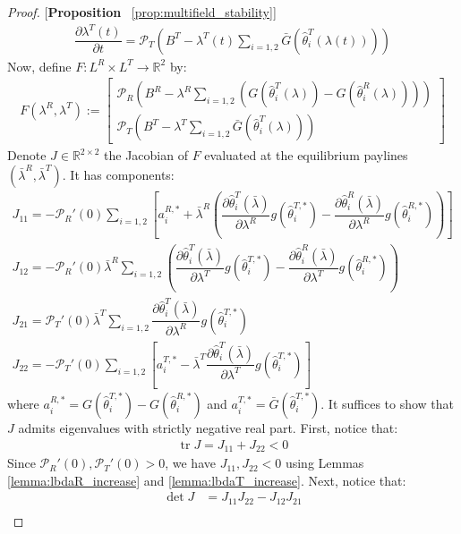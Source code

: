 \begin{proof}{[\textbf{Proposition} ~\ref{prop:multifield_stability}]}
\begin{gather*}
  \dfrac{\partial \lambda^T(t)}{\partial t} = \mathcal{P}_T\left(B^T - \lambda^T(t)\sum_{i=1,2}\bar{G}(\hat{\theta}_i^T(\lambda(t)))\right)
\end{gather*}
Now, define $F:L^R\times L^T\rightarrow \mathbb{R}^2$ by:
\begin{align*}
  F(\lambda^R,\lambda^T) := \begin{bmatrix}\mathcal{P}_R\left(B^R -  \lambda^R\sum_{i=1,2}(G(\hat{\theta}^{T}_i(\lambda)) - G(\hat{\theta}^{R}_i(\lambda)))\right)  \\ \mathcal{P}_T\left(B^T - \lambda^T\sum_{i=1,2}\bar{G}(\hat{\theta}_i^T(\lambda))\right) \end{bmatrix}
\end{align*}
Denote $J\in \mathbb{R}^{2\times 2}$ the Jacobian of $F$ evaluated at the equilibrium paylines $(\bar{\lambda}^R,\bar{\lambda}^T)$. It has components:
\begin{gather*}
  J_{11} = -\mathcal{P}_R'(0)\sum_{i=1,2}\left[a_i^{R,*} + \bar{\lambda}^R\left(\dfrac{\partial \hat{\theta}_i^T(\bar{\lambda})}{\partial \lambda^R}g(\hat{\theta}_i^{T,*}) - \dfrac{\partial \hat{\theta}^R_i(\bar{\lambda})}{\partial \lambda^R}g(\hat{\theta}^{R,*}_i)\right)\right] \\ 
  J_{12} = -\mathcal{P}_R'(0)\bar{\lambda}^R\sum_{i=1,2}\left(\dfrac{\partial \hat{\theta}_i^T(\bar{\lambda})}{\partial \lambda^T}g(\hat{\theta}_i^{T,*}) - \dfrac{\partial \hat{\theta}^R_i(\bar{\lambda})}{\partial \lambda^T}g(\hat{\theta}^{R,*}_i)\right)\\ 
  J_{21} = \mathcal{P}_T'(0)\bar{\lambda}^T\sum_{i=1,2}\dfrac{\partial \hat{\theta}_i^T(\bar{\lambda}) }{\partial \lambda^R}g(\hat{\theta}^{T,*}_i) \\ 
  J_{22} = -\mathcal{P}_T'(0)\sum_{i=1,2}\left[a_i^{T,*} - \bar{\lambda}^T\dfrac{\partial \hat{\theta}_i^T(\bar{\lambda})}{\partial \lambda^T}g(\hat{\theta}_i^{T,*})\right]
\end{gather*}
where $a_i^{R,*} = G(\hat{\theta}^{T,*}_i) - G(\hat{\theta}^{R,*}_i)$ and $a_i^{T,*} = \bar{G}(\hat{\theta}^{T,*}_i)$. It suffices to show that $J$ admits eigenvalues with strictly negative real part. First, notice that:
\begin{align*}
  \operatorname{tr} J = J_{11} + J_{22}<0
\end{align*}
Since $\mathcal{P}_R'(0),\mathcal{P}_T'(0)>0$, we have $J_{11},J_{22}<0$ using Lemmas \ref{lemma:lbdaR_increase} and \ref{lemma:lbdaT_increase}. Next, notice that:
\begin{align*}
  \operatorname{det} J &= J_{11}J_{22} - J_{12}J_{21} \\

\end{align*}
\end{proof}
